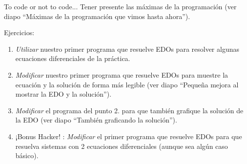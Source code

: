 \documentclass{beamer}
\begin{document}
%




\begin{frame}{To code or not to code...}
\alert{Tener presente las máximas de la programación} (ver diapo ``Máximas de la programación que vimos hasta ahora'').
\begin{block}{Ejercicios:}
	\begin{enumerate}
		\item \emph{Utilizar} nuestro primer programa que resuelve EDOs para resolver algunas ecuaciones diferenciales de la práctica.
		\item \emph{Modificar} nuestro primer programa que resuelve EDOs para muestre la ecuación y la solución de forma más legible (ver diapo ``Pequeña mejora al mostrar la EDO y la solución'').
		\item \emph{Modificar} el programa del punto 2. para que también grafique la solución de la EDO (ver diapo ``También graficando la solución'').
		\item \alert{¡Bonus Hacker! \dCooley:} \emph{Modificar} el primer programa que resuelve EDOs para que resuelva sistemas con 2 ecuaciones diferenciales (aunque sea algún caso básico). 
	\end{enumerate}
\end{block}

\end{frame}
\end{document}
